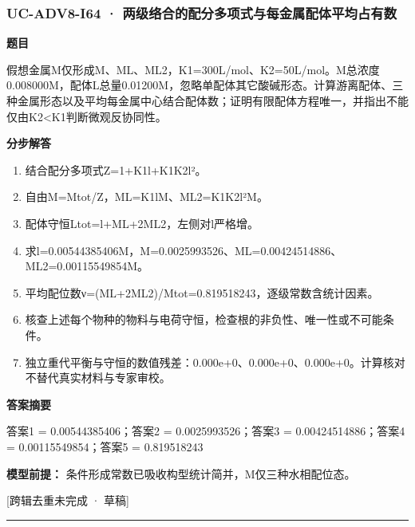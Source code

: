 \documentclass[UTF8,11pt,a4paper]{ctexart}
\begin{document}
\subsubsection*{UC-ADV8-I64 · 两级络合的配分多项式与每金属配体平均占有数}
\noindent\textbf{题目}\par
假想金属M仅形成M、ML、ML2，K1=300L/mol、K2=50L/mol。M总浓度0.008000M，配体L总量0.01200M，忽略单配体其它酸碱形态。计算游离配体、三种金属形态以及平均每金属中心结合配体数；证明有限配体方程唯一，并指出不能仅由K2<K1判断微观反协同性。\par
\medskip\noindent\textbf{分步解答}
\begin{enumerate}
\item 结合配分多项式Z=1+K1l+K1K2l²。
\item 自由M=Mtot/Z，ML=K1lM、ML2=K1K2l²M。
\item 配体守恒Ltot=l+ML+2ML2，左侧对l严格增。
\item 求l=0.00544385406M，M=0.0025993526、ML=0.00424514886、ML2=0.00115549854M。
\item 平均配位数ν=(ML+2ML2)/Mtot=0.819518243，逐级常数含统计因素。
\item 核查上述每个物种的物料与电荷守恒，检查根的非负性、唯一性或不可能条件。
\item 独立重代平衡与守恒的数值残差：0.000e+0、0.000e+0、0.000e+0。计算核对不替代真实材料与专家审校。
\end{enumerate}
\noindent\textbf{答案摘要}\par
答案1 = 0.00544385406；答案2 = 0.0025993526；答案3 = 0.00424514886；答案4 = 0.00115549854；答案5 = 0.819518243\par
\noindent\textbf{模型前提：}
条件形成常数已吸收构型统计简并，M仅三种水相配位态。\par
\noindent\textcolor{red!65!black}{[跨辑去重未完成 · 草稿]} \par
\medskip\hrule\medskip
{}
\end{document}
